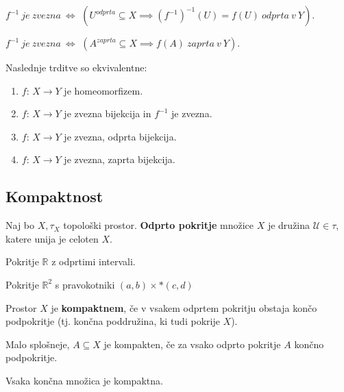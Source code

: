 \documentclass[11pt, a4paper]{article}
\begin{document}
    \(f^{-1}\ je\ zvezna\ \Longleftrightarrow\) \((U^{odprta} \subseteq X \implies (f^{-1})^{-1} (U) = f(U)\ odprta\ v\ Y)\).
    \par
    \(f^{-1}\ je\ zvezna\ \Longleftrightarrow\) \((A^{zaprta} \subseteq X \implies f(A)\ zaprta\ v\ Y)\).

    
    \begin{theorem}
        Naslednje trditve so ekvivalentne:
        \begin{enumerate}[label=(\arabic*)]
            \item \(f\): \(X \to Y\) je homeomorfizem.
            \item \(f\): \(X \to Y\) je zvezna bijekcija in \(f^{-1}\) je zvezna.
            \item \(f\): \(X \to Y\) je zvezna, odprta bijekcija.
            \item \(f\): \(X \to Y\) je zvezna, zaprta bijekcija.
        \end{enumerate}
    \end{theorem}

    \subsection{Kompaktnost}

    \begin{definition}
        Naj bo \(X,\tau_X\) topološki prostor. \textbf{Odprto pokritje} množice \(X\) je družina \(\mathscr{U} \in \tau\), katere unija je celoten \(X\).
    \end{definition}

    \begin{example}
        Pokritje \(\mathbb{R}\) z odprtimi intervali.
    \end{example}

    \begin{example}
        Pokritje \(\mathbb{R}^2\) s pravokotniki \((a,b) \times *(c,d)\)
    \end{example}


    \begin{definition}
        Prostor \(X\) je \textbf{kompaktnem}, če v vsakem odprtem pokritju obstaja končo podpokritje (tj. končna poddružina, ki tudi pokrije \(X\)).
    \end{definition}

    Malo splošneje, \(A \subseteq X\) je kompakten, če za vsako odprto pokritje \(A\) končno podpokritje.

    \begin{example}
        Vsaka končna množica je kompaktna.
    \end{example}
\end{document}
